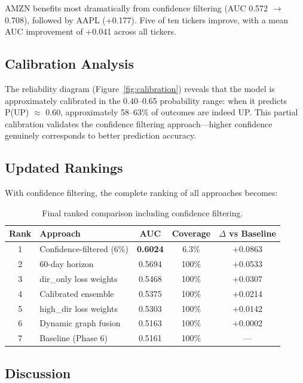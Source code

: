 \documentclass[12pt,a4paper]{article}
\begin{document}
\noindent AMZN benefits most dramatically from confidence filtering (AUC 0.572 $\rightarrow$ 0.708), followed by AAPL (+0.177). Five of ten tickers improve, with a mean AUC improvement of +0.041 across all tickers.

\subsection{Calibration Analysis}

The reliability diagram (Figure~\ref{fig:calibration}) reveals that the model is approximately calibrated in the 0.40--0.65 probability range: when it predicts P(UP) $\approx$ 0.60, approximately 58--63\% of outcomes are indeed UP. This partial calibration validates the confidence filtering approach---higher confidence genuinely corresponds to better prediction accuracy.

\subsection{Updated Rankings}

With confidence filtering, the complete ranking of all approaches becomes:

\begin{table}[H]
\centering
\caption{Final ranked comparison including confidence filtering.}
\begin{tabular}{clccc}
\toprule
\textbf{Rank} & \textbf{Approach} & \textbf{AUC} & \textbf{Coverage} & \textbf{$\Delta$ vs Baseline} \\
\midrule
1 & Confidence-filtered (6\%)  & \textbf{0.6024} & 6.3\% & +0.0863 \\
2 & 60-day horizon             & 0.5694 & 100\% & +0.0533 \\
3 & dir\_only loss weights     & 0.5468 & 100\% & +0.0307 \\
4 & Calibrated ensemble        & 0.5375 & 100\% & +0.0214 \\
5 & high\_dir loss weights     & 0.5303 & 100\% & +0.0142 \\
6 & Dynamic graph fusion       & 0.5163 & 100\% & +0.0002 \\
7 & Baseline (Phase 6)         & 0.5161 & 100\% & --- \\
\bottomrule
\end{tabular}
\end{table}

\subsection{Discussion}
\end{document}
